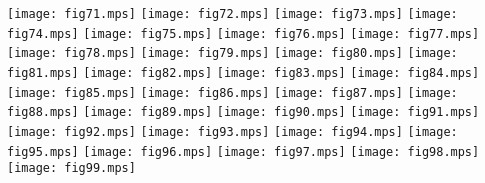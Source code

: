 \newpage
\texttt{[image: fig71.mps]}
\newpage
\texttt{[image: fig72.mps]}
\newpage
\texttt{[image: fig73.mps]}
\newpage
\texttt{[image: fig74.mps]}
\newpage
\texttt{[image: fig75.mps]}
\newpage
\texttt{[image: fig76.mps]}
\newpage
\texttt{[image: fig77.mps]}
\newpage
\texttt{[image: fig78.mps]}
\newpage
\texttt{[image: fig79.mps]}
\newpage
\texttt{[image: fig80.mps]}
\newpage
\texttt{[image: fig81.mps]}
\newpage
\texttt{[image: fig82.mps]}
\newpage
\texttt{[image: fig83.mps]}
\newpage
\texttt{[image: fig84.mps]}
\newpage
\texttt{[image: fig85.mps]}
\newpage
\texttt{[image: fig86.mps]}
\newpage
\texttt{[image: fig87.mps]}
\newpage
\texttt{[image: fig88.mps]}
\newpage
\texttt{[image: fig89.mps]}
\newpage
\texttt{[image: fig90.mps]}
\newpage
\texttt{[image: fig91.mps]}
\newpage
\texttt{[image: fig92.mps]}
\newpage
\texttt{[image: fig93.mps]}
\newpage
\texttt{[image: fig94.mps]}
\newpage
\texttt{[image: fig95.mps]}
\newpage
\texttt{[image: fig96.mps]}
\newpage
\texttt{[image: fig97.mps]}
\newpage
\texttt{[image: fig98.mps]}
\newpage
\texttt{[image: fig99.mps]}
\newpage

